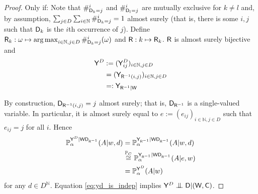 \begin{proof}
Only if:
Note that $\#_{\mathsf{D}_k=j}^i$ and $\#_{\mathsf{D}_l=j}^i$ are mutually exclusive for $k\neq l$ and, by assumption, $\sum_{j\in D}\sum_{i\in \mathbb{N}} \#_{\mathsf{D}_k=j}^i=1$ almost surely (that is, there is some $i,j$ such that $\mathsf{D}_k$ is the $i$th occurrence of $j$). Define $\mathsf{R}_k:\omega \mapsto \operatorname*{arg\,max}_{i\in\mathbb{N},j\in D} \#_{\mathsf{D}_k=j}^i(\omega)$ and $\mathsf{R}:k\mapsto \mathsf{R}_k$. $\mathsf{R}$ is almost surely bijective and 
\begin{align}
    \mathsf{Y}^D&:= (\mathsf{Y}^D_{ij})_{i\in \mathbb{N},j\in D}\\
    &= (\mathsf{Y}_{\mathsf{R}^{-1}(i,j)})_{i\in \mathbb{N},j\in D}\\
    &=: \mathsf{Y}_{\mathsf{R}^{-1}|\mathsf{W}}
\end{align}

By construction, $\mathsf{D}_{\mathsf{R}^{-1}(i,j)}=j$ almost surely; that is, $\mathsf{D}_{\mathsf{R}^{-1}}$ is a single-valued variable. In particular, it is almost surely equal to $e:=(e_{ij})_{i\in\mathbb{N},j\in D}$ such that $e_{ij}=j$ for all $i$. Hence
\begin{align}
    \mathbb{P}_\alpha^{\mathsf{Y}^D|\mathsf{W}\mathsf{D}_{\mathsf{R}^{-1}}}(A|w,d)&= \mathbb{P}_\alpha^{\mathsf{Y}_{\mathsf{R}^{-1}}|\mathsf{W}\mathsf{D}_{\mathsf{R}^{-1}}}(A|w,d)\\
    &\overset{\mathbb{P}_C}{\cong} \mathbb{P}_\alpha^{\mathsf{Y}_{\mathsf{R}^{-1}}|\mathsf{W}\mathsf{D}_{\mathsf{R}^{-1}}}(A|e,w)\label{eq:yd_is_indep}\\
    &= \mathbb{P}_\alpha^{\mathsf{Y}^D}(A|w)\label{eq:yd_dist}
\end{align}
for any $d\in D^{\mathbb{N}}$. Equation \ref{eq:yd_is_indep} implies $\RV{Y}^D\CI \RV{D}|(\RV{W},\RV{C})$.


\end{proof}
